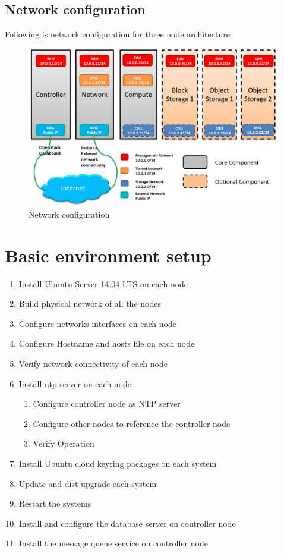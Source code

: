     \subsection{Network configuration}
    \par Following is network configuration for three node architecture 
    \begin{figure}[h]
        \centering
        \includegraphics[height=7cm,width=13cm]{images/network_config.png}
        \caption{Network configuration} 
     \end{figure}
     
\section{Basic environment setup}
    \begin{enumerate}
        \item Install Ubuntu Server 14.04 LTS  on each node
        \item Build physical network of all the nodes
        \item Configure networks interfaces on each node
        \item Configure Hostname and hosts file on each node
        \item Verify network connectivity of each node
        \item Install ntp server on each node
        \begin{enumerate}
            \item Configure controller node as NTP server 
            \item Configure other nodes to reference the controller node
            \item Verify Operation
        \end{enumerate}
        \item Install Ubuntu cloud keyring packages on each system
        \item Update and dist-upgrade each system
        \item Restart the systems
        \item Install and configure the database server on controller node
        \item Install the message queue service on controller node
    \end{enumerate}
    
